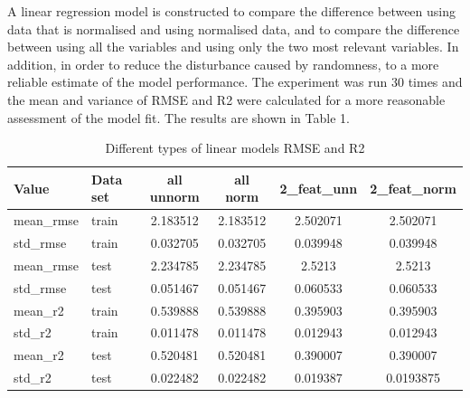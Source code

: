 \documentclass[conference]{IEEEtran}
\begin{document}
A linear regression model is constructed to compare the difference between using data that is normalised and using normalised data, and to compare the difference between using all the variables and using only the two most relevant variables. In addition, in order to reduce the disturbance caused by randomness, to a more reliable estimate of the model performance. The experiment was run 30 times and the mean and variance of RMSE and R2 were calculated for a more reasonable assessment of the model fit. The results are shown in Table 1.

\begin{table}[htbp]
    \centering
    \caption{Different types of linear models RMSE and R2}
    \begin{tabular}{|l|l|c|c|c|c|}
        \hline
        \textbf{Value} & \textbf{Data set} & \textbf{all unnorm} & \textbf{all norm} & \textbf{2\_feat\_unn} & \textbf{2\_feat\_norm} \\ \hline
        mean\_rmse & train & 2.183512 & 2.183512 & 2.502071 & 2.502071 \\ \hline
        std\_rmse & train & 0.032705 & 0.032705 & 0.039948 & 0.039948 \\ \hline
        mean\_rmse & test & 2.234785 & 2.234785 & 2.5213 & 2.5213 \\ \hline
        std\_rmse & test & 0.051467 & 0.051467 & 0.060533 & 0.060533 \\ \hline
        mean\_r2 & train & 0.539888 & 0.539888 & 0.395903 & 0.395903 \\ \hline
        std\_r2 & train & 0.011478 & 0.011478 & 0.012943 & 0.012943 \\ \hline
        mean\_r2 & test & 0.520481 & 0.520481 & 0.390007 & 0.390007 \\ \hline
        std\_r2 & test & 0.022482 & 0.022482 & 0.019387 & 0.0193875 \\ \hline
    \end{tabular}
    \label{tab:linear_models_rmse_r2}
\end{table}
\end{document}
